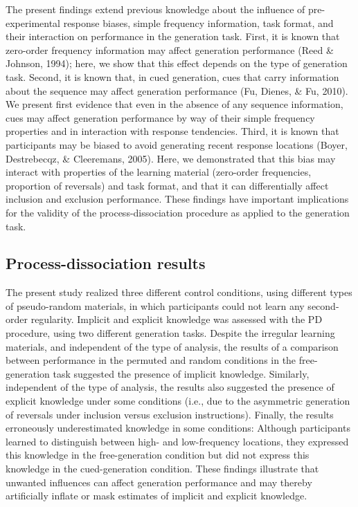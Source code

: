 \documentclass[
  english,
  man]{apa6}
\begin{document}
The present findings extend previous knowledge about the influence of pre-experimental response biases, simple frequency information, task format, and their interaction on performance in the generation task. First, it is known that zero-order frequency information may affect generation performance (Reed \& Johnson, 1994); here, we show that this effect depends on the type of generation task.
Second, it is known that, in cued generation, cues that carry information about the sequence may affect generation performance (Fu, Dienes, \& Fu, 2010).
We present first evidence that even in the absence of any sequence information, cues may affect generation performance by way of their simple frequency properties and in interaction with response tendencies.
Third, it is known that participants may be biased to avoid generating recent response locations (Boyer, Destrebecqz, \& Cleeremans, 2005).
Here, we demonstrated that this bias may interact with properties of the learning material (zero-order frequencies, proportion of reversals) and task format, and that it can differentially affect inclusion and exclusion performance.
These findings have important implications for the validity of the process-dissociation procedure as applied to the generation task.

\hypertarget{process-dissociation-results}{%
\subsection{Process-dissociation results}\label{process-dissociation-results}}

The present study realized three different control conditions, using different types of pseudo-random materials, in which participants could not learn any second-order regularity.
Implicit and explicit knowledge was assessed with the PD procedure, using two different generation tasks.
Despite the irregular learning materials, and independent of the type of analysis, the results of a comparison between performance in the permuted and random conditions in the free-generation task suggested the presence of implicit knowledge.
Similarly, independent of the type of analysis, the results also suggested the presence of explicit knowledge under some conditions (i.e., due to the asymmetric generation of reversals under inclusion versus exclusion instructions).
Finally, the results erroneously underestimated knowledge in some conditions: Although participants learned to distinguish between high- and low-frequency locations, they expressed this knowledge in the free-generation condition but did not express this knowledge in the cued-generation condition.
These findings illustrate that unwanted influences can affect generation performance and may thereby artificially inflate or mask estimates of implicit and explicit knowledge.
\end{document}
